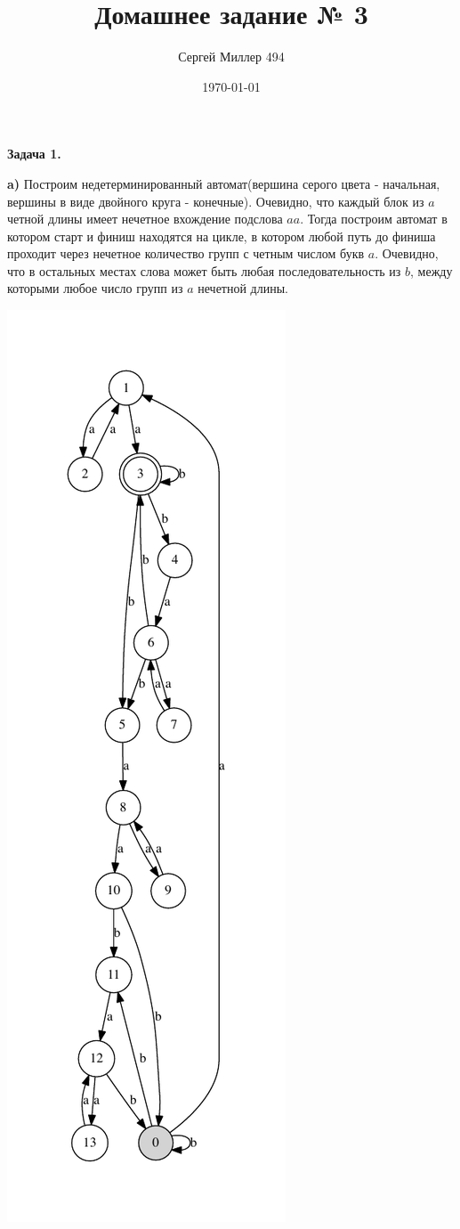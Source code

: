 \documentclass[12pt]{article}
\title{Домашнее задание № 3}
\date{\today}
\author{Сергей Миллер 494}
\begin{document}
 	\maketitle
	\textbf{Задача 1.}
 	
  	\textbf{a)}
      Построим недетерминированный автомат(вершина серого цвета - начальная, вершины в виде двойного круга - конечные).
      Очевидно, что каждый блок из $a$ четной длины имеет нечетное вхождение подслова  $aa$. Тогда построим автомат в котором старт и финиш находятся на цикле, в котором любой путь до финиша проходит через нечетное количество групп с четным числом букв $a$. Очевидно, что в остальных местах слова может быть любая последовательность из $b$, между которыми любое число групп из $a$ нечетной длины.

      \includegraphics{nfae5.pdf}
\end{document}
